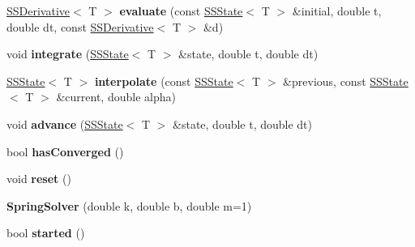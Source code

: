 \begin{DoxyCompactItemize}
\mbox{\hyperlink{struct_p_o_p_1_1_s_s_derivative}{S\+S\+Derivative}}$<$ T $>$ {\bfseries evaluate} (const \mbox{\hyperlink{struct_p_o_p_1_1_s_s_state}{S\+S\+State}}$<$ T $>$ \&initial, double t, double dt, const \mbox{\hyperlink{struct_p_o_p_1_1_s_s_derivative}{S\+S\+Derivative}}$<$ T $>$ \&d)
\item 
\mbox{\label{class_p_o_p_1_1_spring_solver_a78a0959ade98d12b699617b1aa8ce127}} 
void {\bfseries integrate} (\mbox{\hyperlink{struct_p_o_p_1_1_s_s_state}{S\+S\+State}}$<$ T $>$ \&state, double t, double dt)
\item 
\mbox{\label{class_p_o_p_1_1_spring_solver_a6b63d72b07f26a68160fbaf5220f86e9}} 
\mbox{\hyperlink{struct_p_o_p_1_1_s_s_state}{S\+S\+State}}$<$ T $>$ {\bfseries interpolate} (const \mbox{\hyperlink{struct_p_o_p_1_1_s_s_state}{S\+S\+State}}$<$ T $>$ \&previous, const \mbox{\hyperlink{struct_p_o_p_1_1_s_s_state}{S\+S\+State}}$<$ T $>$ \&current, double alpha)
\item 
\mbox{\label{class_p_o_p_1_1_spring_solver_ac06df8a265f5a3a209f2a84fcc6e08ee}} 
void {\bfseries advance} (\mbox{\hyperlink{struct_p_o_p_1_1_s_s_state}{S\+S\+State}}$<$ T $>$ \&state, double t, double dt)
\item 
\mbox{\label{class_p_o_p_1_1_spring_solver_a1e1bea30a3e7ce42de0521666147e12c}} 
bool {\bfseries has\+Converged} ()
\item 
\mbox{\label{class_p_o_p_1_1_spring_solver_a9b51b8b9f6c7991a2ef0eff842e482ec}} 
void {\bfseries reset} ()
\item 
\mbox{\label{class_p_o_p_1_1_spring_solver_a96cc1e1b11e2ad7eda996a237934ee23}} 
{\bfseries Spring\+Solver} (double k, double b, double m=1)
\item 
\mbox{\label{class_p_o_p_1_1_spring_solver_aa7a738e12fecab509749095fa676ead5}} 
bool {\bfseries started} ()
\item 
\mbox{\label{class_p_o_p_1_1_spring_solver_ac0232661f5dd1ba0c7245a1ae235a069}} 

\end{DoxyCompactItemize}
